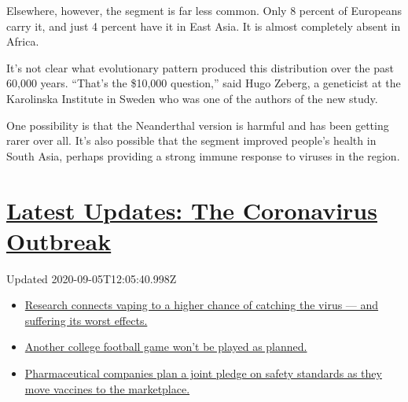 Elsewhere, however, the segment is far less common. Only 8 percent of
Europeans carry it, and just 4 percent have it in East Asia. It is
almost completely absent in Africa.

It's not clear what evolutionary pattern produced this distribution over
the past 60,000 years. ``That's the \$10,000 question,'' said Hugo
Zeberg, a geneticist at the Karolinska Institute in Sweden who was one
of the authors of the new study.

One possibility is that the Neanderthal version is harmful and has been
getting rarer over all. It's also possible that the segment improved
people's health in South Asia, perhaps providing a strong immune
response to viruses in the region.

\hypertarget{latest-updates-the-coronavirus-outbreak}{%
\section{\texorpdfstring{\href{https://www.nytimes3xbfgragh.onion/2020/09/04/world/covid-19-coronavirus.html?action=click\&pgtype=Article\&state=default\&region=MAIN_CONTENT_1\&context=storylines_live_updates}{Latest
Updates: The Coronavirus
Outbreak}}{Latest Updates: The Coronavirus Outbreak}}\label{latest-updates-the-coronavirus-outbreak}}

Updated 2020-09-05T12:05:40.998Z

\begin{itemize}
\tightlist
\item
  \href{https://www.nytimes3xbfgragh.onion/2020/09/04/world/covid-19-coronavirus.html?action=click\&pgtype=Article\&state=default\&region=MAIN_CONTENT_1\&context=storylines_live_updates\#link-1654f6ad}{Research
  connects vaping to a higher chance of catching the virus --- and
  suffering its worst effects.}
\item
  \href{https://www.nytimes3xbfgragh.onion/2020/09/04/world/covid-19-coronavirus.html?action=click\&pgtype=Article\&state=default\&region=MAIN_CONTENT_1\&context=storylines_live_updates\#link-52e4198a}{Another
  college football game won't be played as planned.}
\item
  \href{https://www.nytimes3xbfgragh.onion/2020/09/04/world/covid-19-coronavirus.html?action=click\&pgtype=Article\&state=default\&region=MAIN_CONTENT_1\&context=storylines_live_updates\#link-181cef0}{Pharmaceutical
  companies plan a joint pledge on safety standards as they move
  vaccines to the marketplace.}
\end{itemize}

